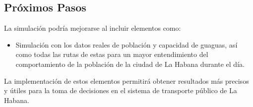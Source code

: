 \documentclass[a4paper,12pt]{article}
\begin{document}
\subsection{Próximos Pasos}

La simulación podría mejorarse al incluir elementos como:

\begin{itemize}
\item Simulación con los datos reales de población y capacidad de guaguas, así como todas las rutas de estas para un mayor entendimiento del comportamiento de la población de la ciudad de La Habana durante el día.
\end{itemize}

La implementación de estos elementos permitirá obtener resultados más precisos y útiles para la toma de decisiones en el sistema de transporte público de La Habana.


\end{document}
